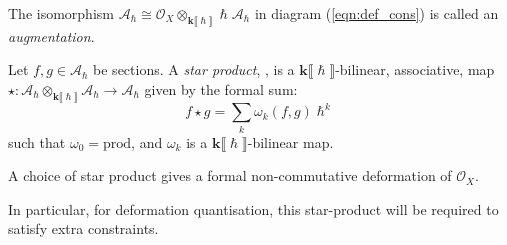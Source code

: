     

    

   
   
    \begin{rem} The isomorphism 
    \( \mathcal{A}_\hslash \cong \mathcal{O}_X \otimes_{\mathbf{k}\lBrack \hslash \rBrack} \hslash \mathcal{A}_\hslash\) in diagram (\ref{eqn:def_cons}) is called an \textit{augmentation}.
    \end{rem}
    
    
    
    \begin{defn}
    \label{defn:star_prod}
    Let \(f,g \in  \mathcal{A}_{\hslash}\) be sections. A \emph{star product}, \cite{collini}, is a \(\mathbf{k}\lBrack \hslash \rBrack \)-bilinear, associative, map
    \(\star : \mathcal{A}_{\hslash}\otimes_{\mathbf{k}\lBrack\hslash\rBrack} \mathcal{A}_{\hslash} \rightarrow \mathcal{A}_{\hslash}\)
    given by the formal sum:
    \begin{equation} 
        \label{eqn:star_prod_formal}
        f \star g = \sum_k \omega_k(f,g) \hslash^k
    \end{equation}
    such that \(\omega_0 = \mathrm{prod} \), and \(\omega_k\) is a \( \mathbf{k}\lBrack \hslash \rBrack\)-bilinear map. 
    \end{defn}
    

    \begin{corollary}
    A choice of star product gives a formal non-commutative deformation of \( \mathcal{O}_X\). 
    \end{corollary}
    In particular, for deformation quantisation, this star-product will be required to satisfy extra constraints. 
    
